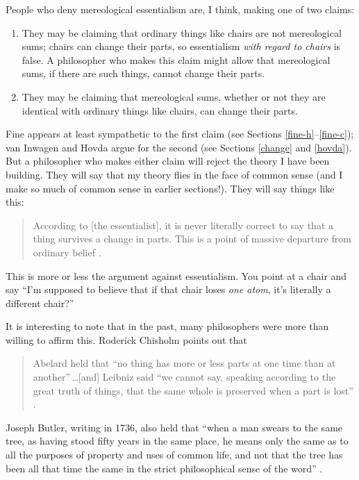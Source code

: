 \documentclass[12pt,twoside]{reedfancy}
\begin{document}
\begin{spacing}{1.25}
People who deny mereological essentialism are, I think, making one of
two claims:

\begin{enumerate}
  \item They may be claiming that ordinary things like chairs are not
    mereological sums; chairs can change their parts, so essentialism
    {\em with regard to chairs} is false.  A philosopher who makes
    this claim might allow that mereological sums, if there are such
    things, cannot change their parts.
  \item They may be claiming that mereological sums, whether or not
    they are identical with ordinary things like chairs, can change
    their parts.
\end{enumerate}

Fine appears at least sympathetic to the first claim (see Sections
\ref{fine-h}--\ref{fine-c}); van Inwagen and Hovda argue for the
second (see Sections \ref{change} and \ref{hovda}).  But a philosopher
who makes either claim will reject the theory I have been building.
They will say that my theory flies in the face of common sense (and I
make so much of common sense in earlier sections!).  They will say
things like this:

\begin{quote}
According to [the essentialist], it is never literally correct to say
that a thing survives a change in parts.  This is a point of massive
departure from ordinary belief \citep[184]{sider2001}.
\end{quote}

This is more or less the argument against essentialism.  You point at
a chair and say ``I'm supposed to believe that if that chair loses
{\em one atom}, it's literally a different chair?''

It is interesting to note that in the past, many philosophers were
more than willing to affirm this.  Roderick Chisholm points out that

\begin{quote}
Abelard held that ``no thing has more or less parts at one time than
at another''\,\ldots [and] Leibniz said ``we cannot say, speaking
according to the great truth of things, that the same whole is
preserved when a part is lost'' \citeyearpar[145]{chisholm1979}.
\end{quote}

Joseph Butler, writing in 1736, also held that ``when a man swears to
the same tree, as having stood fifty years in the same place, he means
only the same as to all the purposes of property and uses of common
life, and not that the tree has been all that time the same in the
strict philosophical sense of the word''
\citeyearpar[100]{butler1975a}.


\end{spacing}
\end{document}
